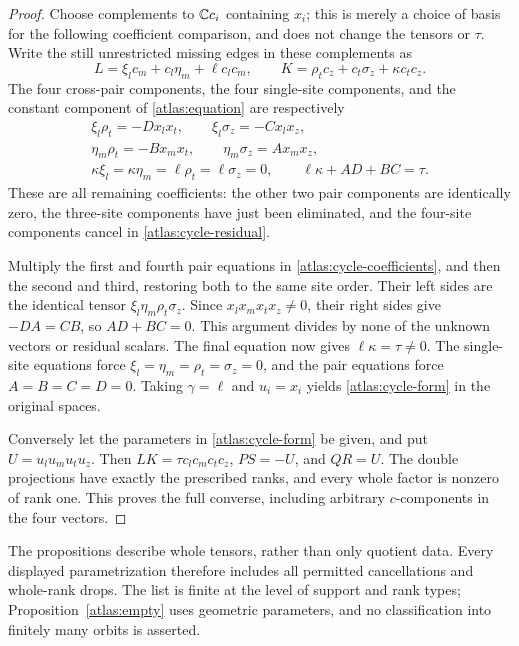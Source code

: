 \begin{proof}
Choose complements to \(\mathbb C c_i\) containing \(x_i\); this is merely a
choice of basis for the following coefficient comparison, and does not
change the tensors or \(\tau\).  Write the still unrestricted missing edges
in these complements as
\[
 L=\xi_lc_m+c_l\eta_m+\ell c_lc_m,\qquad
 K=\rho_tc_z+c_t\sigma_z+\kappa c_tc_z.
\]
The four cross-pair components, the four single-site components, and the
constant component of \eqref{atlas:equation} are respectively
\begin{equation}\label{atlas:cycle-coefficients}
\begin{gathered}
 \xi_l\rho_t=-D x_lx_t,\qquad
 \xi_l\sigma_z=-C x_lx_z,\\
 \eta_m\rho_t=-B x_mx_t,\qquad
 \eta_m\sigma_z=A x_mx_z,\\
 \kappa\xi_l=\kappa\eta_m=\ell\rho_t=\ell\sigma_z=0,\qquad
 \ell\kappa+AD+BC=\tau.
\end{gathered}
\end{equation}
These are all remaining coefficients: the other two pair components are
identically zero, the three-site components have just been eliminated,
and the four-site components cancel in \eqref{atlas:cycle-residual}.

Multiply the first and fourth pair equations in
\eqref{atlas:cycle-coefficients}, and then the second and third, restoring
both to the same site order.  Their left sides are the identical tensor
\(\xi_l\eta_m\rho_t\sigma_z\).  Since \(x_lx_mx_tx_z\ne0\), their right
sides give \(-DA=CB\), so \(AD+BC=0\).
This argument divides by none of the unknown vectors or residual scalars.
The final equation now gives \(\ell\kappa=\tau\ne0\).
The single-site equations force \(\xi_l=\eta_m=\rho_t=\sigma_z=0\),
and the pair equations force \(A=B=C=D=0\).
Taking \(\gamma=\ell\) and \(u_i=x_i\) yields
\eqref{atlas:cycle-form} in the original spaces.

Conversely let the parameters in \eqref{atlas:cycle-form} be given, and put
\(U=u_lu_mu_tu_z\).  Then \(LK=\tau c_lc_mc_tc_z\), \(PS=-U\), and
\(QR=U\).  The double projections have exactly the prescribed ranks,
and every whole factor is nonzero of rank one.  This proves the full
converse, including arbitrary \(c\)-components in the four vectors.
\end{proof}

The propositions describe whole tensors, rather than only quotient data.
Every displayed parametrization therefore includes all permitted cancellations
and whole-rank drops.  The list is finite at the level of support and rank
types; Proposition~\ref{atlas:empty} uses geometric parameters, and no
classification into finitely many orbits is asserted.
